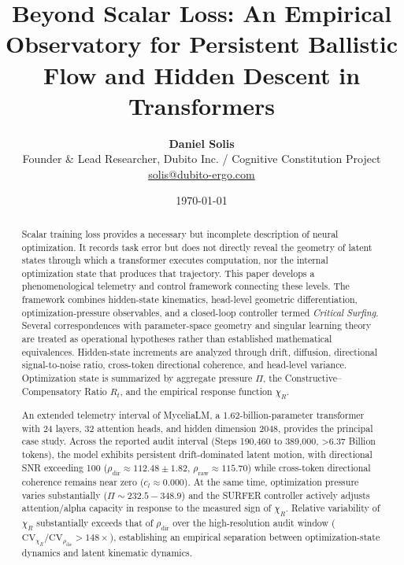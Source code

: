 \documentclass[11pt,twocolumn]{article}
\title{\textbf{Beyond Scalar Loss: An Empirical Observatory for Persistent Ballistic Flow and Hidden Descent in Transformers}}
\author{\textbf{Daniel Solis}\\ \small Founder \& Lead Researcher, Dubito Inc. / Cognitive Constitution Project\\ \small \href{mailto:solis@dubito-ergo.com}{solis@dubito-ergo.com}}
\date{\today}
\begin{document}
\maketitle

\begin{abstract}
Scalar training loss provides a necessary but incomplete description of neural optimization. It records task error but does not directly reveal the geometry of latent states through which a transformer executes computation, nor the internal optimization state that produces that trajectory. This paper develops a phenomenological telemetry and control framework connecting these levels. The framework combines hidden-state kinematics, head-level geometric differentiation, optimization-pressure observables, and a closed-loop controller termed \textit{Critical Surfing}. Several correspondences with parameter-space geometry and singular learning theory are treated as operational hypotheses rather than established mathematical equivalences. Hidden-state increments are analyzed through drift, diffusion, directional signal-to-noise ratio, cross-token directional coherence, and head-level variance. Optimization state is summarized by aggregate pressure $\Pi$, the Constructive--Compensatory Ratio $R_t$, and the empirical response function $\chi_R$.

An extended telemetry interval of MyceliaLM, a 1.62-billion-parameter transformer with 24 layers, 32 attention heads, and hidden dimension 2048, provides the principal case study. Across the reported audit interval (Steps 190,460 to 389,000, >6.37 Billion tokens), the model exhibits persistent drift-dominated latent motion, with directional SNR exceeding 100 ($\rho_{\mathrm{dir}} \approx 112.48 \pm 1.82$, $\rho_{\mathrm{raw}} \approx 115.70$) while cross-token directional coherence remains near zero ($c_l \approx 0.000$). At the same time, optimization pressure varies substantially ($\Pi \sim 232.5 - 348.9$) and the SURFER controller actively adjusts attention/alpha capacity in response to the measured sign of $\chi_R$. Relative variability of $\chi_R$ substantially exceeds that of $\rho_{\mathrm{dir}}$ over the high-resolution audit window ($\text{CV}_{\chi_R} / \text{CV}_{\rho_{\mathrm{dir}}} > 148\times$), establishing an empirical separation between optimization-state dynamics and latent kinematic dynamics.


\end{abstract}
\end{document}
